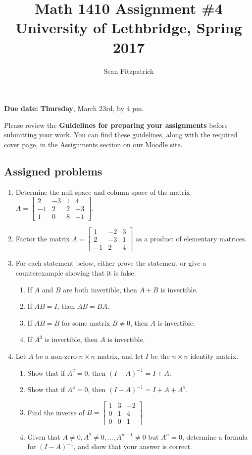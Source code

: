 \documentclass[letterpaper,12pt]{article}
\title{Math 1410 Assignment \#4\\University of Lethbridge, Spring 2017}
\author{Sean Fitzpatrick}
\newcommand{\bbm}{\begin{bmatrix}}
\newcommand{\ebm}{\end{bmatrix}}
\begin{document}
 \maketitle

{\bf Due date:} {\bf Thursday}, March 23rd, by 4 pm.

\bigskip

Please review the {\bf Guidelines for preparing your assignments} before submitting your work. You can find these guidelines, along with the required cover page, in the Assignments section on our Moodle site.



\subsection*{Assigned problems}
\begin{enumerate}
\item Determine the null space and column space of the matrix $A = \bbm 2&-3&1&4\\-1&2&2&-3\\1&0&8&-1\ebm$.


\item Factor the matrix $A = \bbm 1&-2&3\\2&-3&1\\-1&2&4\ebm$ as a product of elementary matrices.

\item For each statement below, either prove the statement or give a counterexample showing that it is false.
\begin{enumerate}
 \item If $A$ and $B$ are both invertible, then $A+B$ is invertible.
 \item If $AB=I$, then $AB=BA$.
 \item If $AB=B$ for some matrix $B\neq 0$, then $A$ is invertible. 
 \item If $A^3$ is invertible, then $A$ is invertible.
\end{enumerate}

\item Let $A$ be a non-zero $n\times n$ matrix, and let $I$ be the $n\times n$ identity matrix.
\begin{enumerate}
 \item Show that if $A^2=0$, then $(I-A)^{-1} = I+A$.
 \item Show that if $A^3=0$, then $(I-A)^{-1} = I+A+A^2$.
 \item Find the inverse of $B = \bbm 1&3&-2\\0&1&4\\0&0&1\ebm$.
 \item Given that $A\neq 0, A^2\neq 0, \ldots, A^{n-1}\neq 0$ but $A^n=0$, determine a formula for $(I-A)^{-1}$, and show that your answer is correct.
\end{enumerate}


\end{enumerate}
\end{document}
